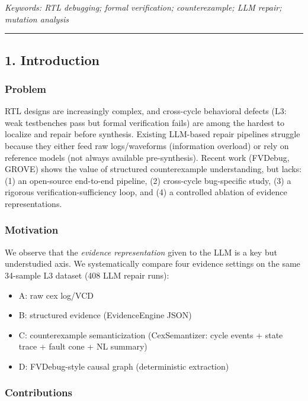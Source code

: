 \documentclass[
  11pt,
]{article}
\providecommand{\tightlist}{%
  \setlength{\itemsep}{0pt}\setlength{\parskip}{0pt}}
\begin{document}
\emph{Keywords: RTL debugging; formal verification; counterexample; LLM repair; mutation analysis}

\begin{center}\rule{0.5\linewidth}{0.5pt}\end{center}

\subsection{1. Introduction}\label{introduction}

\subsubsection{Problem}\label{problem}

RTL designs are increasingly complex, and cross-cycle behavioral defects (L3: weak testbenches pass but formal verification fails) are among the hardest to localize and repair before synthesis. Existing LLM-based repair pipelines struggle because they either feed raw logs/waveforms (information overload) or rely on reference models (not always available pre-synthesis). Recent work (FVDebug, GROVE) shows the value of structured counterexample understanding, but lacks: (1) an open-source end-to-end pipeline, (2) cross-cycle bug-specific study, (3) a rigorous verification-sufficiency loop, and (4) a controlled ablation of evidence representations.

\subsubsection{Motivation}\label{motivation}

We observe that the \emph{evidence representation} given to the LLM is a key but understudied axis. We systematically compare four evidence settings on the same 34-sample L3 dataset (408 LLM repair runs):

\begin{itemize}
\tightlist
\item
  A: raw cex log/VCD
\item
  B: structured evidence (EvidenceEngine JSON)
\item
  C: counterexample semanticization (CexSemantizer: cycle events + state trace + fault cone + NL summary)
\item
  D: FVDebug-style causal graph (deterministic extraction)
\end{itemize}

\subsubsection{Contributions}\label{contributions}
\end{document}
